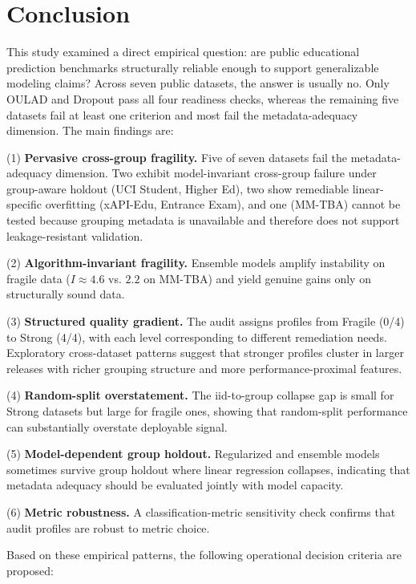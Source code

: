 \documentclass[10pt,letterpaper]{article}
\begin{document}
\section{Conclusion}

This study examined a direct empirical question: are public educational prediction benchmarks structurally reliable enough to support generalizable modeling claims? Across seven public datasets, the answer is usually no. Only OULAD and Dropout pass all four readiness checks, whereas the remaining five datasets fail at least one criterion and most fail the metadata-adequacy dimension. The main findings are:

(1) \textbf{Pervasive cross-group fragility.} Five of seven datasets fail the metadata-adequacy dimension. Two exhibit model-invariant cross-group failure under group-aware holdout (UCI Student, Higher Ed), two show remediable linear-specific overfitting (xAPI-Edu, Entrance Exam), and one (MM-TBA) cannot be tested because grouping metadata is unavailable and therefore does not support leakage-resistant validation.

(2) \textbf{Algorithm-invariant fragility.} Ensemble models amplify instability on fragile data ($I \approx 4.6$ vs. $2.2$ on MM-TBA) and yield genuine gains only on structurally sound data.

(3) \textbf{Structured quality gradient.} The audit assigns profiles from Fragile (0/4) to Strong (4/4), with each level corresponding to different remediation needs. Exploratory cross-dataset patterns suggest that stronger profiles cluster in larger releases with richer grouping structure and more performance-proximal features.

(4) \textbf{Random-split overstatement.} The iid-to-group collapse gap is small for Strong datasets but large for fragile ones, showing that random-split performance can substantially overstate deployable signal.

(5) \textbf{Model-dependent group holdout.} Regularized and ensemble models sometimes survive group holdout where linear regression collapses, indicating that metadata adequacy should be evaluated jointly with model capacity.

(6) \textbf{Metric robustness.} A classification-metric sensitivity check confirms that audit profiles are robust to metric choice.

Based on these empirical patterns, the following operational decision criteria are proposed:
\end{document}
